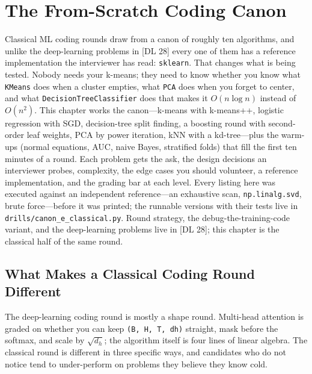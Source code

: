 \chapter{The From-Scratch Coding Canon}
\label{cml:chap:coding_canon}

\begin{tldr}
Classical ML coding rounds draw from a canon of roughly ten algorithms, and unlike the deep-learning problems in [DL 28] every one of them has a reference implementation the interviewer has read: \texttt{sklearn}. That changes what is being tested. Nobody needs your k-means; they need to know whether you know what \texttt{KMeans} does when a cluster empties, what \texttt{PCA} does when you forget to center, and what \texttt{DecisionTreeClassifier} does that makes it $O(n \log n)$ instead of $O(n^2)$. This chapter works the canon---k-means with k-means++, logistic regression with SGD, decision-tree split finding, a boosting round with second-order leaf weights, PCA by power iteration, kNN with a kd-tree---plus the warm-ups (normal equations, AUC, naive Bayes, stratified folds) that fill the first ten minutes of a round. Each problem gets the ask, the design decisions an interviewer probes, complexity, the edge cases you should volunteer, a reference implementation, and the grading bar at each level. Every listing here was executed against an independent reference---an exhaustive scan, \texttt{np.linalg.svd}, brute force---before it was printed; the runnable versions with their tests live in \texttt{drills/canon\_e\_classical.py}. Round strategy, the debug-the-training-code variant, and the deep-learning problems live in [DL 28]; this chapter is the classical half of the same round.
\end{tldr}

\section{What Makes a Classical Coding Round Different}
\label{cml:sec:classical_round}

The deep-learning coding round is mostly a shape round. Multi-head attention is graded on whether you can keep \texttt{(B, H, T, dh)} straight, mask before the softmax, and scale by $\sqrt{d_h}$; the algorithm itself is four lines of linear algebra. The classical round is different in three specific ways, and candidates who do not notice tend to under-perform on problems they believe they know cold.

